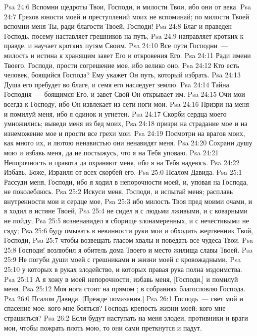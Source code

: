 \vs Psa 24:6 Вспомни щедроты Твои, Господи, и милости Твои, ибо они от века.
\vs Psa 24:7 Грехов юности моей и преступлений моих не вспоминай; по милости Твоей вспомни меня Ты, ради благости Твоей, Господи!
\vs Psa 24:8 Благ и праведен Господь, посему наставляет грешников на путь,
\vs Psa 24:9 направляет кротких к правде, и научает кротких путям Своим.
\vs Psa 24:10 Все пути Господни~--- милость и истина к хранящим завет Его и откровения Его.
\vs Psa 24:11 Ради имени Твоего, Господи, прости согрешение мое, ибо велико оно.
\vs Psa 24:12 Кто есть человек, боящийся Господа? Ему укажет Он путь, который избрать.
\vs Psa 24:13 Душа его пребудет во благе, и семя его наследует землю.
\vs Psa 24:14 Тайна Господня~--- боящимся Его, и завет Свой Он открывает им.
\vs Psa 24:15 Очи мои всегда к Господу, ибо Он извлекает из сети ноги мои.
\vs Psa 24:16 Призри на меня и помилуй меня, ибо я одинок и угнетен.
\vs Psa 24:17 Скорби сердца моего умножились; выведи меня из бед моих,
\vs Psa 24:18 призри на страдание мое и на изнеможение мое и прости все грехи мои.
\vs Psa 24:19 Посмотри на врагов моих, как много их, и  лютою ненавистью они ненавидят меня.
\vs Psa 24:20 Сохрани душу мою и избавь меня, да не постыжусь, что я на Тебя уповаю.
\vs Psa 24:21 Непорочность и правота да охраняют меня, ибо я на Тебя надеюсь.
\vs Psa 24:22 Избавь, Боже, Израиля от всех скорбей его.
\vs Psa 25:0 Псалом Давида.
\rsbpar\vs Psa 25:1 Рассуди меня, Господи, ибо я ходил в непорочности моей, и, уповая на Господа, не поколеблюсь.
\vs Psa 25:2 Искуси меня, Господи, и испытай меня; расплавь внутренности мои и сердце мое,
\vs Psa 25:3 ибо милость Твоя пред моими очами, и я ходил в истине Твоей,
\vs Psa 25:4 не сидел я с людьми лживыми, и с коварными не пойду;
\vs Psa 25:5 возненавидел я сборище злонамеренных, и с нечестивыми не сяду;
\vs Psa 25:6 буду омывать в невинности руки мои и обходить жертвенник Твой, Господи,
\vs Psa 25:7 чтобы возвещать гласом хвалы и поведать все чудеса Твои.
\vs Psa 25:8 Господи! возлюбил я обитель дома Твоего и место жилища славы Твоей.
\vs Psa 25:9 Не погуби души моей с грешниками и жизни моей с кровожадными,
\vs Psa 25:10 у которых в руках злодейство, и которых правая рука полна мздоимства.
\vs Psa 25:11 А я хожу в моей непорочности; избавь меня, [Господи,] и помилуй меня.
\vs Psa 25:12 Моя нога стоит на прямом ; в собраниях благословлю Господа.
\vs Psa 26:0 Псалом Давида. [Прежде помазания.]
\rsbpar\vs Psa 26:1 Господь~--- свет мой и спасение мое: кого мне бояться? Господь крепость жизни моей: кого мне страшиться?
\vs Psa 26:2 Если будут наступать на меня злодеи, противники и враги мои, чтобы пожрать плоть мою, то они сами преткнутся и падут.
